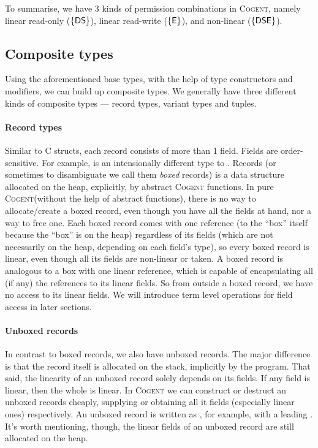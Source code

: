 \documentclass[a4paper]{article}
\newcommand{\cogent}{\textsc{Cogent}\xspace}
\newcommand{\Cogent}{\cogent}
\begin{document}
To summarise, we have 3 kinds of permission combinations in \cogent, namely linear read-only ($\mathsf{\{DS\}}$),
linear read-write ($\mathsf{\{E\}}$), and non-linear ($\mathsf{\{DSE\}}$).


\subsection{Composite types}

Using the aforementioned base types, with the help of type constructors and modifiers, we can build up
composite types. We generally have three different kinds of composite types --- record types, variant types
and tuples.

\paragraph{Record types} Similar to C structs, each record consists of more than 1 field. Fields are order-sensitive.
For example,  is an intensionally different type to .
Records (or sometimes to disambiguate we call them \emph{boxed} records) is a data structure allocated on the heap,
explicitly, by abstract \Cogent functions. In pure \Cogent (without the help of abstract functions), there is no way to allocate/create
a boxed record, even though you have all the fields at hand, nor a way to free one. Each boxed record comes with
one reference (to the ``box'' itself because the ``box'' is on the heap) regardless of its fields (which
are not necessarily on the heap, depending on each field's type), so every
boxed record is linear, even though all its fields are non-linear or taken. A boxed record is analogous to
a box with one linear reference, which is capable of encapsulating all (if any) the references to its linear fields. So from outside
a boxed record, we have no access to its linear fields. We will introduce term level operations for field access in later sections.

\paragraph{Unboxed records} In contrast to boxed records, we also have unboxed records. The major difference is that
the record itself is allocated on the stack, implicitly by the program. That said, the linearity of an unboxed record
solely depends on its fields. If any field is linear, then the whole is linear. In \cogent we can construct or destruct an
unboxed records cheaply, supplying or obtaining all it fields (especially linear ones) respectively. An unboxed record
is written as , for example, with a leading \code{\#}. It's worth mentioning, though, the linear
fields of an unboxed record are still allocated on the heap.
\end{document}

